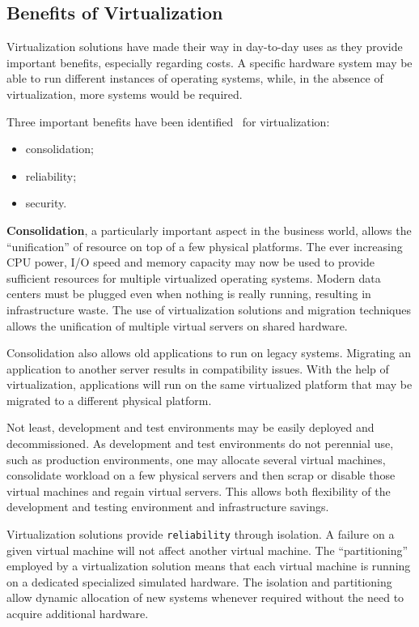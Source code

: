 \subsection{Benefits of Virtualization}

Virtualization solutions have made their way in day-to-day uses as they
provide important benefits, especially regarding costs. A specific hardware
system may be able to run different instances of operating systems, while, in
the absence of virtualization, more systems would be required.

Three important benefits have been identified~\cite{best-damn-virt} for
virtualization:

\begin{itemize}
  \item consolidation;
  \item reliability;
  \item security.
\end{itemize}

\textbf{Consolidation}, a particularly important aspect in the business world,
allows the ``unification'' of resource on top of a few physical platforms. The
ever increasing CPU power, I/O speed and memory capacity may now be used to
provide sufficient resources for multiple virtualized operating systems.
Modern data centers must be plugged even when nothing is really running,
resulting in infrastructure waste. The use of virtualization solutions and
migration techniques allows the unification of multiple virtual servers on
shared hardware.

Consolidation also allows old applications to run on legacy systems. Migrating
an application to another server results in compatibility issues. With the
help of virtualization, applications will run on the same virtualized platform
that may be migrated to a different physical platform.

Not least, development and test environments may be easily deployed and
decommissioned. As development and test environments do not perennial use, such
as production environments, one may allocate several virtual machines,
consolidate workload on a few physical servers and then scrap or disable those
virtual machines and regain virtual servers. This allows both flexibility of
the development and testing environment and infrastructure savings.

Virtualization solutions provide \texttt{reliability} through isolation. A
failure on a given virtual machine will not affect another virtual machine.
The ``partitioning'' employed by a virtualization solution means that each
virtual machine is running on a dedicated specialized simulated hardware. The
isolation and partitioning allow dynamic allocation of new systems whenever
required without the need to acquire additional hardware.

